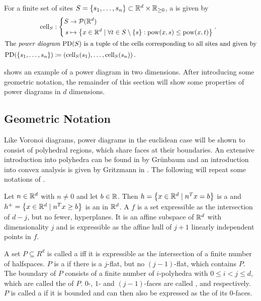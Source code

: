 \newpage %
\begin{definition}
    \label{def:powerdiagram}
    For a finite set of sites $S = \left\{ s_1, \dots, s_n \right\} \subset \mathbb{R}^d \times \mathbb{R}_{\geq 0}$, a  is given by
    \begin{align}
        \operatorname{cell}_S &: \left\{\begin{aligned}
            S &\to \mathcal{P}(\mathbb{R}^d)\\
            s &\mapsto \left\{ x \in \mathbb{R}^d \mid \forall t \in S \setminus \left\{ s \right\}: \operatorname{pow}(x, s) \leq \operatorname{pow}(x, t) \right\}
        \end{aligned}\right..\\
        \intertext{The \emph{power diagram $\operatorname{PD}(S)$} is a tuple of the cells corresponding to all sites and given by}
        \operatorname{PD}(\left\{ s_1, \dots, s_n \right\}) &\coloneqq \left( \operatorname{cell}_S(s_1), \dots, \operatorname{cell}_S(s_n) \right).
    \end{align}
\end{definition}

 shows an example of a power diagram in two dimensions.
After introducing some geometric notation, the remainder of this section will show some properties of power diagrams in $d$ dimensions.

\subsection{Geometric Notation}
\label{sub:geometric_notation}
Like Voronoi diagrams, power diagrams in the euclidean case will be shown to consist of polyhedral regions, which share faces at their boundaries.
An extensive introduction into polyhedra can be found in \cite{grunbaum2003convex} by Grünbaum and an introduction into convex analysis is given by Gritzmann in \cite{gritzmann2013grundlagen}.
The following will repeat some notations of \cite{aurenhammer1987power}.

Let $n \in \mathbb{R}^d$ with $n \neq 0$ and let $b \in \mathbb{R}$.
Then $h = \left\{ x \in \mathbb{R}^d \mid n^T x = b \right\}$ is a  and $h^+ = \left\{ x \in \mathbb{R}^d \mid n^T x \geq b \right\}$ is an  in $\mathbb{R}^d$.
A  $f$ is a set expressible as the intersection of $d - j$, but no fewer, hyperplanes.
It is an affine subspace of $\mathbb{R}^d$ with dimensionality $j$ and is expressible as the affine hull of $j + 1$ linearly independent points in $f$.

A set $P \subseteq R^d$ is called a  iff it is expressible as the intersection of a finite number of halfspaces.
$P$ is a  if there is a $j$-flat, but no $(j-1)$-flat, which contains $P$.
The boundary of $P$ consists of a finite number of $i$-polyhedra with $0 \leq i < j \leq d$, which are called the  of $P$.
$0$-, $1$- and $(j - 1)$-faces are called ,  and  respectively.
$P$ is called a  if it is bounded and can then also be expressed as the  of its $0$-faces.

